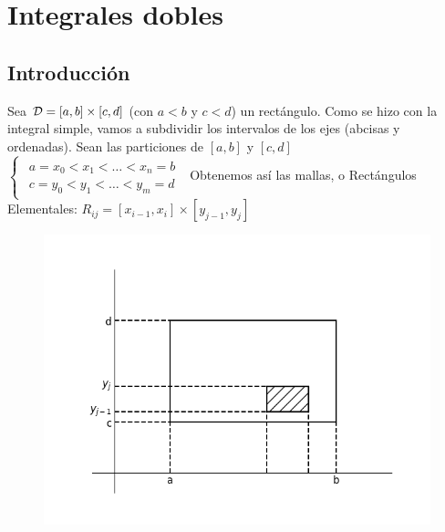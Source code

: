 \documentclass{report}
\begin{document}
\chapter{Integrales dobles}
  \section{Introducción}
    \noindent Sea $\mathcal{D}=\left[a,b\right]\times\left[c,d\right]$ (con $a<b$ y $c<d$)
    un rectángulo. Como se hizo con la integral simple, vamos a subdividir
    los intervalos de los ejes (abcisas y ordenadas). Sean las particiones de
    $\left[a,b\right]$ y $\left[c,d\right]$\\ \setlength\extrarowheight{0pt}
    $\begin{cases}\begin{aligned}a=x_0<x_1<\hdots<x_n=b\\c=y_0<y_1<\hdots<y_m=d\end{aligned}\end{cases}$
    Obtenemos así las mallas, o Rectángulos Elementales:
    $R_{ij}=\left[x_{i-1},x_i\right]\times\left[y_{j-1},y_j\right]$
    \begin{figure}
      \hspace{-0.3cm}
      \includegraphics[width=.4\textwidth]{integralesdobles.png}
    \end{figure}
    \clearpage
\end{document}
